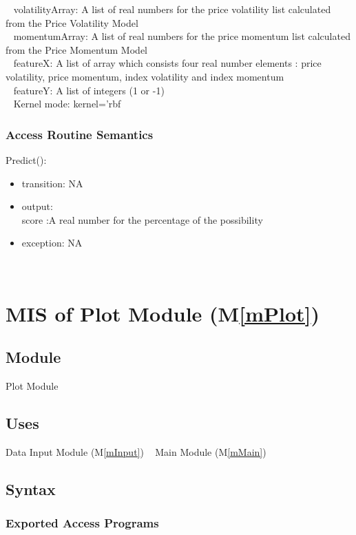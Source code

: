 \documentclass[12pt, titlepage]{article}
\newcommand{\mref}[1]{M\ref{#1}}
\begin{document}
~\newline
volatilityArray: A list of real numbers for the price volatility list calculated from the Price Volatility Model\\
~\newline
momentumArray: A list of real numbers for the price momentum list calculated from the Price Momentum Model\\
~\newline
featureX: A list of array which consists four real number elements : price volatility, price momentum, index volatility and index momentum\\ 
~\newline
featureY: A list of integers (1 or -1)\\ 
~\newline
Kernel mode: kernel='rbf
\subsubsection{Access Routine Semantics}

\noindent Predict():
\begin{itemize}
\item transition: NA
\item output:\\
score :A real number for the percentage of the possibility
\item exception: NA
\end{itemize}

~\newpage

\section{MIS of Plot Module (\mref{mPlot}) } 

\subsection{Module}
Plot Module
\subsection{Uses}
Data Input Module (\mref{mInput})
~\newline
Main Module (\mref{mMain})
\subsection{Syntax}

\subsubsection{Exported Access Programs}
\end{document}
